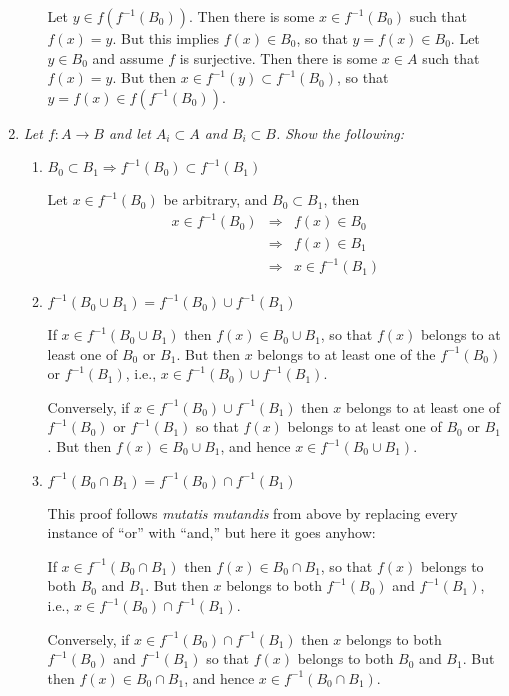 \documentclass[letterpaper, 11pt]{article}
\begin{document}
\begin{enumerate}
\begin{enumerate}
Let $y \in f(f^{-1}(B_0))$.  Then there is some $x \in f^{-1}(B_0)$ such that $f(x) = y$.  But this implies $f(x) \in B_0$, so that $y = f(x) \in B_0$.  Let $y \in B_0$ and assume $f$ is surjective.  Then there is some $x \in A$ such that $f(x) = y$.  But then $x \in f^{-1}(y) \subset f^{-1}(B_0)$, so that $y = f(x) \in f(f^{-1}(B_0))$.


\end{enumerate}

\item \emph{Let $f: A \rightarrow B$ and let $A_i \subset A$ and $B_i \subset B$.  Show the following:}
\begin{enumerate}
\item \emph{$B_0 \subset B_1 \Rightarrow f^{-1}(B_0) \subset f^{-1}(B_1)$}

Let $x \in f^{-1}(B_0)$ be arbitrary, and $B_0 \subset B_1$, then
\begin{eqnarray*}
x \in f^{-1}(B_0) &\Rightarrow& f(x) \in B_0 \\
&\Rightarrow& f(x) \in B_1 \\
&\Rightarrow& x \in f^{-1}(B_1)
\end{eqnarray*}
\item \emph{$f^{-1}(B_0 \cup B_1) = f^{-1}(B_0) \cup f^{-1}(B_1)$}

If $x \in f^{-1}(B_0 \cup B_1)$ then $f(x) \in B_0 \cup B_1$, so that $f(x)$ belongs to at least one of $B_0$ or $B_1$.  But then $x$ belongs to at least one of the $f^{-1}(B_0)$ or $f^{-1}(B_1)$, i.e., $x \in f^{-1}(B_0) \cup f^{-1}(B_1)$.

Conversely, if $x \in f^{-1}(B_0) \cup f^{-1}(B_1)$ then $x$ belongs to at least one of $f^{-1}(B_0)$ or $f^{-1}(B_1)$ so that $f(x)$ belongs to at least one of $B_0$ or $B_1$.  But then $f(x) \in B_0 \cup B_1$, and hence $x \in f^{-1}(B_0 \cup B_1)$.

\item \emph{$f^{-1}(B_0 \cap B_1) = f^{-1}(B_0) \cap f^{-1}(B_1)$}

This proof follows \emph{mutatis mutandis} from above by replacing every instance of ``or'' with ``and,'' but here it goes anyhow:

If $x \in f^{-1}(B_0 \cap B_1)$ then $f(x) \in B_0 \cap B_1$, so that $f(x)$ belongs to both $B_0$ and $B_1$.  But then $x$ belongs to both $f^{-1}(B_0)$ and $f^{-1}(B_1)$, i.e., $x \in f^{-1}(B_0) \cap f^{-1}(B_1)$.

Conversely, if $x \in f^{-1}(B_0) \cap f^{-1}(B_1)$ then $x$ belongs to both $f^{-1}(B_0)$ and $f^{-1}(B_1)$ so that $f(x)$ belongs to both $B_0$ and $B_1$.  But then $f(x) \in B_0 \cap B_1$, and hence $x \in f^{-1}(B_0 \cap B_1)$.


\end{enumerate}
\end{enumerate}
\end{document}
